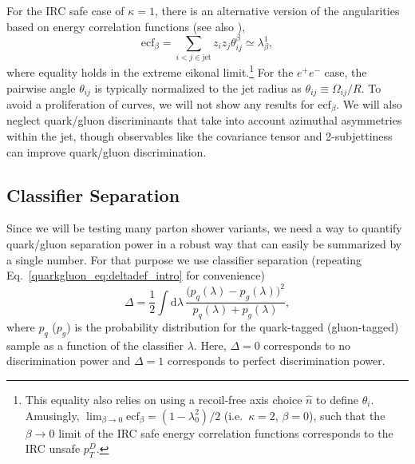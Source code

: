 \documentclass[11pt]{cernrep}
\begin{document}
For the IRC safe case of $\kappa = 1$, there is an alternative version
of the angularities based on energy correlation functions \cite{Larkoski:2013eya} (see also \cite{Banfi:2004yd,Jankowiak:2011qa}),
\begin{equation}
\text{ecf}_\beta = \sum_{i < j \in \text{jet}} z_i z_j \theta_{ij}^\beta \simeq \lambda^{1}_{\beta},
\end{equation}
where equality holds in the extreme eikonal limit.\footnote{This equality also relies on using a recoil-free axis choice $\hat{n}$ to define $\theta_i$.  Amusingly, $\lim_{\beta \to 0} \text{ecf}_\beta = (1 - \lambda^{2}_{0})/2$ (i.e.~$\kappa = 2$, $\beta = 0$), such that the $\beta \to 0$ limit of the IRC safe energy correlation functions corresponds to the IRC unsafe $p_T^D$.}  For the $e^+ e^-$ case, the pairwise angle $\theta_{ij}$ is typically normalized to the jet radius as $\theta_{ij} \equiv \Omega_{ij}/R$.   To avoid a proliferation of curves, we will not show any results for $\text{ecf}_\beta$.  We will also neglect quark/gluon discriminants that take into account azimuthal asymmetries within the jet, though observables like the covariance tensor \cite{Gallicchio:2012ez} and 2-subjettiness \cite{Thaler:2010tr,Thaler:2011gf} can improve quark/gluon discrimination.

\subsection{Classifier Separation}
\label{quarkgluon_sec:classsep}

Since we will be testing many parton shower variants, we need a way to quantify quark/gluon separation power in a robust way that can easily be summarized by a single number.  For that purpose we use classifier separation  (repeating Eq.~\eqref{quarkgluon_eq:deltadef_intro} for convenience)
\begin{equation}
\label{quarkgluon_eq:deltadef}
\Delta =  \frac{1}{2} \int \text{d} \lambda \, \frac{\bigl(p_q(\lambda) - p_g(\lambda)\bigr)^2}{p_q(\lambda) + p_g(\lambda)},
\end{equation}
where $p_q$ ($p_g$) is the probability distribution for the quark-tagged (gluon-tagged) sample as a function of the classifier $\lambda$.  Here, $\Delta = 0$ corresponds to no discrimination power and $\Delta = 1$ corresponds to perfect discrimination power.
\end{document}
